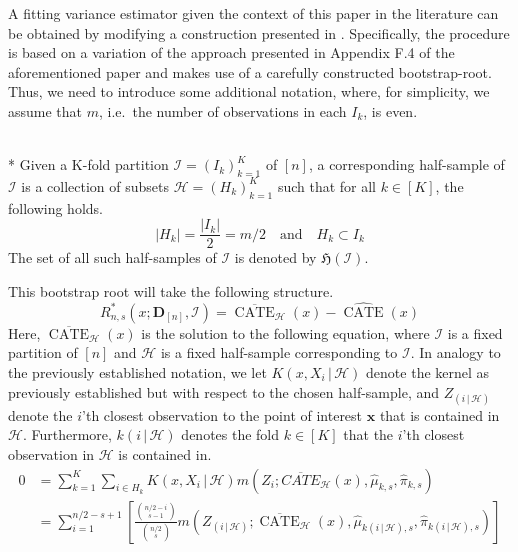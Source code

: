 A fitting variance estimator given the context of this paper in the literature can be obtained by modifying a construction presented in \citet{ritzwoller_uniform_2024}.
Specifically, the procedure is based on a variation of the approach presented in Appendix F.4 of the aforementioned paper and makes use of a carefully constructed bootstrap-root.
Thus, we need to introduce some additional notation, where, for simplicity, we assume that $m$, i.e.\ the number of observations in each $I_k$, is even.
\begin{boxD}
	\begin{dfn}\label{def:CF_HSample}\mbox{}\\*
		Given a K-fold partition $\mathcal{I} = \left(I_k\right)_{k = 1}^{K}$ of $[n]$, a corresponding half-sample of $\mathcal{I}$ is a collection of subsets $\mathcal{H} = \left(H_{k}\right)_{k = 1}^{K}$ such that for all $k \in [K]$, the following holds.
		\begin{equation}
			|H_k| = \frac{|I_k|}{2}= m/2
			\quad \text{and} \quad
			H_k \subset I_k
		\end{equation}
		The set of all such half-samples of $\mathcal{I}$ is denoted by $\mathfrak{H}\left(\mathcal{I}\right)$.
	\end{dfn}
\end{boxD}
This bootstrap root will take the following structure.
\begin{equation}
	R^{*}_{n,s}\left(x; \mathbf{D}_{[n]}, \mathcal{I}\right)
	= \overline{\operatorname{CATE}}_{\mathcal{H}}\left(x\right)
	- \widehat{\operatorname{CATE}}\left(x\right)
\end{equation}
Here, $\overline{\operatorname{CATE}}_{\mathcal{H}}\left(x\right)$ is the solution to the following equation, where $\mathcal{I}$ is a fixed partition of $[n]$ and $\mathcal{H}$ is a fixed half-sample corresponding to $\mathcal{I}$.
In analogy to the previously established notation, we let $K(x, X_{i} \, | \, \mathcal{H})$ denote the kernel as previously established but with respect to the chosen half-sample, and $Z_{(i \, | \, \mathcal{H})}$ denote the $i$'th closest observation to the point of interest $\mathbf{x}$ that is contained in $\mathcal{H}$.
Furthermore, $k(i \, | \, \mathcal{H})$ denotes the fold $k \in [K]$ that the $i$'th closest observation in $\mathcal{H}$ is contained in.
\begin{equation}
	\begin{aligned}
		0 & = \sum_{k = 1}^{K} \sum_{i \in H_k} K(x, X_{i} \, | \, \mathcal{H}) m\left(Z_{i}; \overline{CATE}_{\mathcal{H}}\left(x\right), \hat{\mu}_{k,s}, \hat{\pi}_{k,s}\right)\\
	 	& = \sum_{i = 1}^{n/2 - s + 1} \left[\frac{\binom{n/2-i}{s-1}}{\binom{n/2}{s}} m\left(Z_{(i \, | \, \mathcal{H})}; \overline{\operatorname{CATE}}_{\mathcal{H}}\left(x\right), \hat{\mu}_{k(i \, | \, \mathcal{H}),s}, \hat{\pi}_{k(i\, | \, \mathcal{H}),s}\right)\right]
	\end{aligned}
\end{equation}
